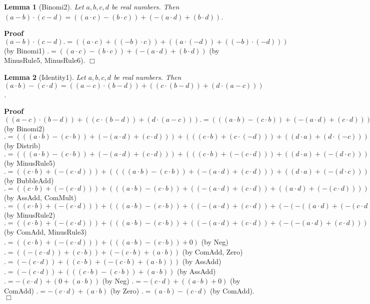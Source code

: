 \documentclass{article}
\newenvironment{forthel}{\begin{leftbar}}{\end{leftbar}}
\newenvironment{proof}{\noindent\textbf{Proof\ }}{\hspace*{\fill}$\Box$\medskip}
\newtheorem{lemma}{Lemma}
\begin{document}
\begin{forthel}
	\begin{lemma} [Binomi2]
	Let $a,b,c,d$ be real numbers.
	Then $(a - b) \cdot (c - d) = ((a \cdot c) - (b \cdot c)) + (-(a \cdot d) + (b \cdot d))$.
	\end{lemma}
	\begin{proof}
	$(a - b) \cdot (c - d) .= ((a \cdot c) + ((-b) \cdot c)) + ((a \cdot (-d)) + ((-b) \cdot (-d)))$ (by Binomi1)
	$.= ((a \cdot c) - (b \cdot c)) + (-(a \cdot d) + (b \cdot d))$ (by MinusRule5, MinusRule6).
	\end{proof}
	
	
	
	\begin{lemma} [Identity1]
	Let $a,b,c,d$ be real numbers. 
	Then $(a \cdot b) - (c \cdot d) = ((a - c) \cdot (b - d)) + ((c \cdot (b - d)) + (d \cdot (a - c)))$.
	\end{lemma}
	\begin{proof}
	$((a - c) \cdot (b - d)) + ((c \cdot (b - d)) + (d \cdot (a - c))) 
	.= (((a \cdot b) - (c \cdot b)) + (-(a \cdot d) + (c \cdot d))) + ((c \cdot (b - d)) + (d \cdot (a - c)))$ (by Binomi2)
	$.= (((a \cdot b) - (c \cdot b)) + (-(a \cdot d) + (c \cdot d))) + (((c \cdot b) + (c \cdot (-d))) + ((d \cdot a) + (d \cdot (-c))))$ (by Distrib)
	$.= (((a \cdot b) - (c \cdot b)) + (-(a \cdot d) + (c \cdot d))) + (((c \cdot b) + (-(c \cdot d))) + ((d \cdot a) + (-(d \cdot c))))$ (by MinusRule5)
	$.= ((c \cdot b) + (-(c \cdot d))) + ((((a \cdot b) - (c \cdot b)) + (-(a \cdot d) + (c \cdot d))) + ((d \cdot a) + (-(d \cdot c))))$ (by BubbleAdd)
	$.= ((c \cdot b) + (-(c \cdot d))) + (((a \cdot b) - (c \cdot b)) + ((-(a \cdot d) + (c \cdot d)) + ((a \cdot d) + (-(c \cdot d)))))$ (by AssAdd, ComMult)
	$.= ((c \cdot b) + (-(c \cdot d))) + (((a \cdot b) - (c \cdot b)) + ((-(a \cdot d) + (c \cdot d)) + (-(-((a \cdot d) + (-(c \cdot d)))))))$ (by MinusRule2)
	$.= ((c \cdot b) + (-(c \cdot d))) + (((a \cdot b) - (c \cdot b)) + ((-(a \cdot d) + (c \cdot d)) + (-(-(a \cdot d) + (c \cdot d)))))$ (by ComAdd, MinusRule3)
	$.= ((c \cdot b) + (-(c \cdot d))) + (((a \cdot b) - (c \cdot b)) + 0)$ (by Neg)
	$.= ((-(c \cdot d)) + (c \cdot b)) + (-(c \cdot b) + (a \cdot b))$ (by ComAdd, Zero)
	$.= (-(c \cdot d)) + ((c \cdot b) + (-(c \cdot b) + (a \cdot b)))$ (by AssAdd)
	$.= (-(c \cdot d)) + (((c \cdot b) -(c \cdot b)) + (a \cdot b))$ (by AssAdd)
	$.= -(c \cdot d) + (0 + (a \cdot b))$ (by Neg)
	$.= -(c \cdot d) + ((a \cdot b) + 0)$ (by ComAdd)
	$.= -(c \cdot d) + (a \cdot b)$ (by Zero)
	$.= (a \cdot b) - (c \cdot d)$ (by ComAdd).
	\end{proof}
	

\end{forthel}
\end{document}
